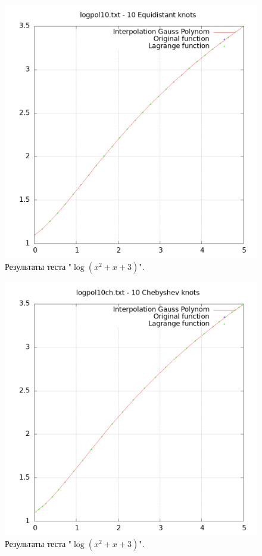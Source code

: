\documentclass[14pt,a4paper]{extarticle}
\newcommand{\1}{\mathbbm{1}}
\begin{document}
    \begin{figure}
        \centering
        \includegraphics[scale=0.5]{Images/logpol10.txt.png}
        \caption{Результаты теста "$\log(x^2 + x + 3)$".}
    \end{figure}

    \begin{figure}
        \centering
        \includegraphics[scale=0.5]{Images/logpol10ch.txt.png}
        \caption{Результаты теста "$\log(x^2 + x + 3)$".}
    \end{figure}
\end{document}
